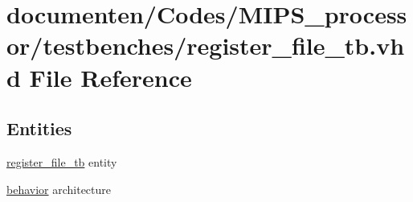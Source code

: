 \hypertarget{register__file__tb_8vhd}{\section{documenten/\-Codes/\-M\-I\-P\-S\-\_\-processor/testbenches/register\-\_\-file\-\_\-tb.vhd File Reference}
\label{register__file__tb_8vhd}
}
\subsection*{Entities}
\begin{DoxyCompactItemize}
\item 
\hyperlink{classregister__file__tb}{register\-\_\-file\-\_\-tb} entity
\item 
\hyperlink{classregister__file__tb_1_1behavior}{behavior} architecture
\end{DoxyCompactItemize}
